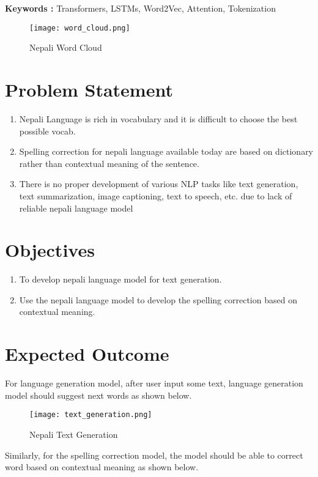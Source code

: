 \textbf{Keywords : } Transformers, LSTMs, Word2Vec, Attention, Tokenization

\begin{figure}[H]
    \centering
    \texttt{[image: word\_cloud.png]}
    \caption{Nepali Word Cloud}
    \label{fig:Nepali Word Cloud}
\end{figure}

\section{Problem Statement}
\begin{enumerate}
    \item Nepali Language is rich in vocabulary and it is difficult to choose the best possible vocab.
    \item Spelling correction for nepali language available today are based on dictionary rather than contextual meaning of the sentence.
    \item There is no proper development of various NLP tasks like text generation, text summarization, image captioning, text to speech, etc. due to lack of reliable nepali language model
\end{enumerate}

\section{Objectives}
\begin{enumerate}
    \item To develop nepali language model for text generation.
    \item Use the nepali language model to develop the spelling correction based on contextual meaning.
\end{enumerate}


\section{Expected Outcome}
For language generation model, after user input some text, language generation model should suggest next words as shown below.

\begin{figure}[H]
    \centering
    \texttt{[image: text\_generation.png]}
    \caption{Nepali Text Generation}
    \label{fig:Nepali Text Generation}
\end{figure}

Similarly, for the spelling correction model, the model should be able to correct word based on contextual meaning as shown below.


